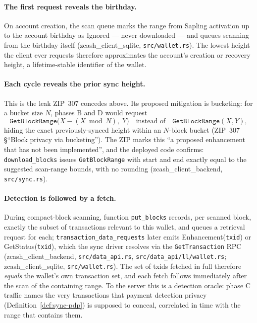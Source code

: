 \documentclass[11pt,a4paper]{article}
\theoremstyle{definition}
\begin{document}
\paragraph{The first request reveals the birthday.} On account creation,
the scan queue marks the range from Sapling activation up to the account
birthday as \textsf{Ignored} --- never downloaded --- and queues scanning
from the birthday itself (\textsf{zcash\_client\_sqlite},
\texttt{src/wallet.rs}). The lowest height the client ever requests
therefore approximates the account's creation or recovery height, a
lifetime-stable identifier of the wallet.

\paragraph{Each cycle reveals the prior sync height.} This is the leak
ZIP~307 concedes above. Its proposed mitigation is bucketing: for a bucket
size $N$, phases \textsf{B} and \textsf{D} would request
\[
  \texttt{GetBlockRange}\bigl(X - (X \bmod N),\; Y\bigr)
  \quad\text{instead of}\quad
  \texttt{GetBlockRange}(X, Y),
\]
hiding the exact previously-synced height within an $N$-block bucket
(ZIP~307 \S``Block privacy via bucketing''). The ZIP marks this ``a
proposed enhancement that has not been implemented'', and the deployed code
confirms: \texttt{download\_blocks} issues \texttt{GetBlockRange} with
start and end exactly equal to the suggested scan-range bounds, with no
rounding (\textsf{zcash\_client\_backend}, \texttt{src/sync.rs}).

\paragraph{Detection is followed by a fetch.} During compact-block
scanning, function \texttt{put\_blocks} records, per scanned block, exactly
the subset of transactions relevant to this wallet, and queues a retrieval
request for each; \texttt{transaction\_data\_requests} later emits
\textsf{Enhancement}(\texttt{txid}) or \textsf{GetStatus}(\texttt{txid}),
which the sync driver resolves via the \texttt{GetTransaction} RPC
(\textsf{zcash\_client\_backend}, \texttt{src/data\_api.rs},
\texttt{src/data\_api/ll/wallet.rs}; \textsf{zcash\_client\_sqlite},
\texttt{src/wallet.rs}). The set of txids fetched in full therefore
\emph{equals} the wallet's own transaction set, and each fetch follows
immediately after the scan of the containing range. To the server this is
a detection oracle: phase \textsf{C} traffic names the very transactions
that payment detection privacy (Definition~\ref{def:sync-pdp}) is supposed
to conceal, correlated in time with the range that contains them.
\end{document}
